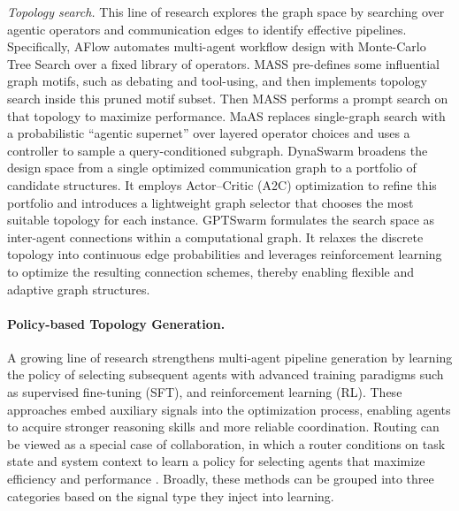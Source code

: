 \emph{Topology search.}
This line of research explores the graph space by searching over agentic operators and communication edges to identify effective pipelines. Specifically, AFlow \cite{zhang2024aflow} automates multi-agent workflow design with Monte-Carlo Tree Search over a fixed library of operators. MASS pre-defines some influential graph motifs, such as debating and tool-using, and then implements topology search inside this pruned motif subset. Then MASS \cite{zhou2025multi} performs a prompt search on that topology to maximize performance. MaAS \cite{zhang2025multi} replaces single-graph search with a probabilistic “agentic supernet” over layered operator choices and uses a controller to sample a query-conditioned subgraph.  DynaSwarm \cite{leong2025dynaswarm} broadens the design space from a single optimized communication graph to a portfolio of candidate structures. It employs Actor–Critic (A2C) optimization to refine this portfolio and introduces a lightweight graph selector that chooses the most suitable topology for each instance. GPTSwarm \cite{zhuge2024gptswarm} formulates the search space as inter-agent connections within a computational graph. It relaxes the discrete topology into continuous edge probabilities and leverages reinforcement learning to optimize the resulting connection schemes, thereby enabling flexible and adaptive graph structures.

\paragraph{Policy-based Topology Generation.}

A growing line of research strengthens multi-agent pipeline generation by learning the policy of selecting subsequent agents with advanced training paradigms such as supervised fine-tuning (SFT), and reinforcement learning (RL). These approaches embed auxiliary signals into the optimization process, enabling agents to acquire stronger reasoning skills and more reliable coordination. Routing can be viewed as a special case of collaboration, in which a router conditions on task state and system context to learn a policy for selecting agents that maximize efficiency and performance \cite{yue2025masrouter,liu2025rcr,qian2025xrouter,wang2025optimal}. Broadly, these methods can be grouped into three categories based on the signal type they inject into learning.

